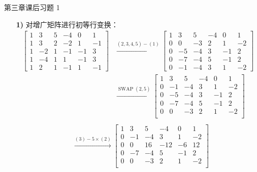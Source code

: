 \begin{problem}
	第三章课后习题 1
	\begin{solution}
		\begin{enumerate}
			\item[\textbf{1)}] 对增广矩阵进行初等行变换：
			$$
			\begin{aligned}
				\left[\begin{array}{ccccc|c}
					1 & 3 & 5 & -4 & 0 & 1 \\
					1 & 3 & 2 & -2 & 1 & -1 \\
					1 & -2 & 1 & -1 & -1 & 3 \\
					1 & -4 & 1 & 1 & -1 & 3 \\
					1 & 2 & 1 & -1 & 1 & -1
				\end{array}\right]
				& \xrightarrow{(2,3,4,5) - (1)} \left[\begin{array}{ccccc|c}
					1 & 3 & 5 & -4 & 0 & 1 \\
					0 & 0 & -3 & 2 & 1 & -2 \\
					0 & -5 & -4 & 3 & -1 & 2 \\
					0 & -7 & -4 & 5 & -1 & 2 \\
					0 & -1 & -4 & 3 & 1 & -2
				\end{array}\right] \\
				& \xrightarrow{\operatorname{SWAP}(2,5)} \left[\begin{array}{ccccc|c}
					1 & 3 & 5 & -4 & 0 & 1 \\
					0 & -1 & -4 & 3 & 1 & -2 \\
					0 & -5 & -4 & 3 & -1 & 2 \\
					0 & -7 & -4 & 5 & -1 & 2 \\
					0 & 0 & -3 & 2 & 1 & -2 \\
				\end{array}\right] \\
			\end{aligned}
			$$
			$$
			\begin{aligned}
				& \xrightarrow{(3)-5 \times (2)} \left[\begin{array}{ccccc|c}
					1 & 3 & 5 & -4 & 0 & 1 \\
					0 & -1 & -4 & 3 & 1 & -2 \\
					0 & 0 & 16 & -12 & -6 & 12 \\
					0 & -7 & -4 & 5 & -1 & 2 \\
					0 & 0 & -3 & 2 & 1 & -2 \\
				\end{array}\right] \\

\end{aligned}$$
\end{enumerate}
\end{solution}
\end{problem}
